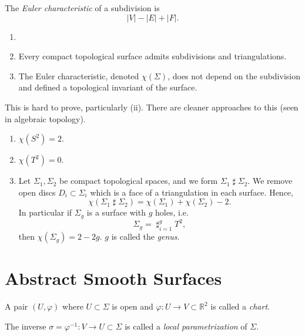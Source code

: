 \documentclass[12pt]{article}
\DeclareMathOperator{\hash}{\sharp}%
\begin{document}
\begin{definition}
	The \emph{Euler characteristic} of a subdivision is
	\[
	|V| - |E| + |F|
	.\]
\end{definition}

\begin{theorem}
	\begin{enumerate}[\normalfont(i)]
		\item[]
		\item Every compact topological surface admits subdivisions and triangulations.
		\item The Euler characteristic, denoted $\chi(\Sigma)$, does not depend on the subdivision and defined a topological invariant of the surface.
	\end{enumerate}
\end{theorem}

\begin{remark}
	This is hard to prove, particularly (ii). There are cleaner approaches to this (seen in algebraic topology).
\end{remark}

\begin{exbox}
	\begin{enumerate}[1.]
		\item $\chi(S^2) = 2$.
		\item $\chi(T^2) = 0$.
		\item Let $\Sigma_1, \Sigma_2$ be compact topological spaces, and we form $\Sigma_1 \hash \Sigma_2$. We remove open discs $D_i \subset \Sigma_i$ which is a face of a triangulation in each surface. Hence,
			\[
			\chi(\Sigma_1 \hash \Sigma_2) = \chi(\Sigma_1) + \chi(\Sigma_2) - 2
			.\]
			In particular if $\Sigma_g$ is a surface with $g$ holes, i.e.
			\[
			\Sigma_g = \hash_{i = 1}^{g} T^2
			,\]
			then $\chi(\Sigma_g) = 2 - 2g$. $g$ is called the \emph{genus}.
	\end{enumerate}
\end{exbox}

\newpage

\section{Abstract Smooth Surfaces}
\label{sec:abstract_smooth_surfaces}

\begin{definition}
	A pair $(U, \varphi)$ where $U \subset \Sigma$ is open and $\varphi : U \to V \subset \mathbb{R}^2$ is called a \emph{chart}.

	The inverse $\sigma = \varphi^{-1} : V \to U \subset \Sigma$ is called a \emph{local parametrization} of $\Sigma$.
\end{definition}
\end{document}
